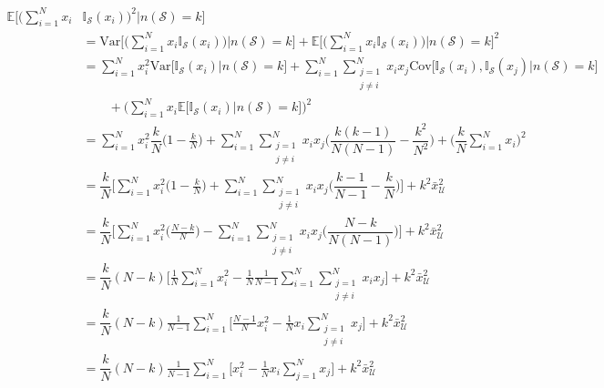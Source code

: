 \documentclass[
]{book}
\begin{document}
\begin{align*}
\mathbb{E}\bigg[ \Big( \sum\limits_{i = 1}^N x_i &  \mathbb{I}_{\mathcal{S}}(x_i)\Big)^2 \bigg| n(\mathcal{S})  = k\bigg] \\ & 
= \textrm{Var}\bigg[ \Big( \sum\limits_{i = 1}^N x_i \mathbb{I}_{\mathcal{S}}(x_i)\Big) \bigg| n(\mathcal{S})  = k\bigg] + \mathbb{E}\bigg[ \Big( \sum\limits_{i = 1}^N x_i \mathbb{I}_{\mathcal{S}}(x_i)\Big) \bigg| n(\mathcal{S})  = k\bigg]^2
\\ & =  \sum\limits_{i = 1}^N x_i^2 \textrm{Var}\Big[ \mathbb{I}_{\mathcal{S}}(x_i) \Big| n(\mathcal{S})  = k\Big] +  \sum\limits_{i = 1}^N\sum\limits_{\substack{j = 1 \\ j \neq i}}^N x_i x_j \textrm{Cov}\Big[ \mathbb{I}_{\mathcal{S}}(x_i), \mathbb{I}_{\mathcal{S}}(x_j) \Big| n(\mathcal{S})  = k\Big] 
\\ & \qquad +  \bigg( \sum\limits_{i = 1}^N x_i \mathbb{E}\Big[  \mathbb{I}_{\mathcal{S}}(x_i) \Big| n(\mathcal{S})  = k\Big]\bigg)^2
\\ & = \sum\limits_{i = 1}^N x_i^2 \dfrac{k}{N}\Big( 1 - \frac{k}{N}\Big) +  \sum\limits_{i = 1}^N\sum\limits_{\substack{j = 1 \\ j \neq i}}^N x_i x_j \Big( \dfrac{k(k-1)}{N(N-1)} - \dfrac{k^2}{N^2}\Big) + \Bigg( \dfrac{k}{N} \sum\limits_{i = 1}^N x_i \Bigg)^2
\\ & =  \dfrac{k}{N}\Bigg[ \sum\limits_{i = 1}^N x_i^2\Big( 1 - \frac{k}{N}\Big) +  \sum\limits_{i = 1}^N\sum\limits_{\substack{j = 1 \\ j \neq i}}^N x_i x_j \bigg( \dfrac{k-1}{N-1} - \dfrac{k}{N}\bigg)\Bigg] + k^2 \bar{x}_{\mathcal{U}}^2
\\ & =  \dfrac{k}{N}\Bigg[ \sum\limits_{i = 1}^N x_i^2\Big(\frac{N-k}{N}\Big) -  \sum\limits_{i = 1}^N\sum\limits_{\substack{j = 1 \\ j \neq i}}^N x_i x_j \bigg(  \dfrac{N-k}{N(N-1)}\bigg)\Bigg] + k^2 \bar{x}_{\mathcal{U}}^2
\\ & =  \dfrac{k}{N}(N-k) \Bigg[ \frac{1}{N}\sum\limits_{i = 1}^N x_i^2 -  \frac{1}{N}\frac{1}{N-1}\sum\limits_{i = 1}^N\sum\limits_{\substack{j = 1 \\ j \neq i}}^N x_i x_j \Bigg] + k^2 \bar{x}_{\mathcal{U}}^2
\\ & =  \dfrac{k}{N}(N-k)  \frac{1}{N-1}\sum\limits_{i = 1}^N \Bigg[ \frac{N-1}{N} x_i^2 -  \frac{1}{N} x_i \sum\limits_{\substack{j = 1 \\ j \neq i}}^N  x_j \Bigg] + k^2 \bar{x}_{\mathcal{U}}^2
\\ & =  \dfrac{k}{N}(N-k)  \frac{1}{N-1}\sum\limits_{i = 1}^N \Bigg[  x_i^2 -  \frac{1}{N} x_i \sum\limits_{j = 1}^N  x_j \Bigg] + k^2 \bar{x}_{\mathcal{U}}^2

\end{align*}
\end{document}
